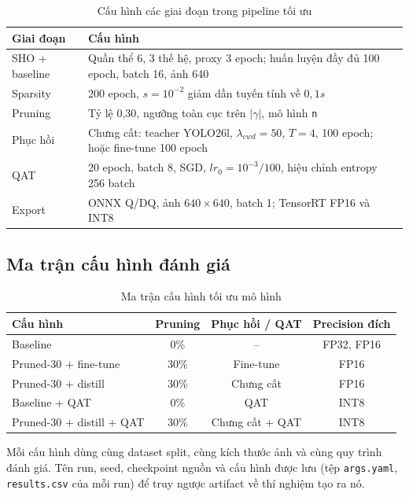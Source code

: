 \begin{table}[H]
\centering
\caption{Cấu hình các giai đoạn trong pipeline tối ưu}
\label{tab:pipeline-hparams}
\begin{tabularx}{\textwidth}{L{3.2cm}Y}
\toprule
\textbf{Giai đoạn} & \textbf{Cấu hình}\\
\midrule
SHO + baseline & Quần thể 6, 3 thế hệ, proxy 3 epoch; huấn luyện đầy đủ 100 epoch, batch 16, ảnh 640\\
Sparsity & 200 epoch, $s=10^{-2}$ giảm dần tuyến tính về $0{,}1s$\\
Pruning & Tỷ lệ 0,30, ngưỡng toàn cục trên $|\gamma|$, mô hình \texttt{n}\\
Phục hồi & Chưng cất: teacher YOLO26l, $\lambda_{cwd}=50$, $T=4$, 100 epoch; hoặc fine-tune 100 epoch\\
QAT & 20 epoch, batch 8, SGD, $lr_0=10^{-3}/100$, hiệu chỉnh entropy 256 batch\\
Export & ONNX Q/DQ, ảnh $640\times640$, batch 1; TensorRT FP16 và INT8\\
\bottomrule
\end{tabularx}
\end{table}

\subsection{Ma trận cấu hình đánh giá}

\begin{table}[H]
\centering
\caption{Ma trận cấu hình tối ưu mô hình}
\label{tab:optimization-configs}
\begin{tabular}{lccc}
\toprule
\textbf{Cấu hình} & \textbf{Pruning} & \textbf{Phục hồi / QAT} & \textbf{Precision đích}\\
\midrule
Baseline & 0\% & -- & FP32, FP16\\
Pruned-30 + fine-tune & 30\% & Fine-tune & FP16\\
Pruned-30 + distill & 30\% & Chưng cất & FP16\\
Baseline + QAT & 0\% & QAT & INT8\\
Pruned-30 + distill + QAT & 30\% & Chưng cất + QAT & INT8\\
\bottomrule
\end{tabular}
\end{table}

Mỗi cấu hình dùng cùng dataset split, cùng kích thước ảnh và cùng quy trình
đánh giá. Tên run, seed, checkpoint nguồn và cấu hình được lưu (tệp
\texttt{args.yaml}, \texttt{results.csv} của mỗi run) để truy ngược artifact về
thí nghiệm tạo ra nó.
